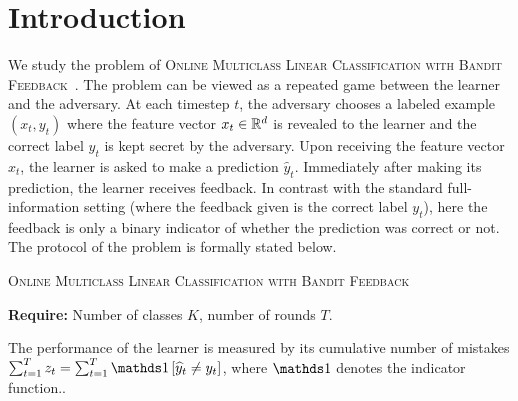 \section{Introduction}
\label{section:introduction}

We study the problem of \textsc{Online Multiclass Linear Classification with
Bandit Feedback}~\citep{Kakade-Shalev-Shwartz-Tewari-2008}. The problem can be
viewed as a repeated game between the learner and the adversary. At each
timestep $t$, the adversary chooses a labeled example $(x_t, y_t)$ where the
feature vector $x_t \in \mathbb{R}^d$ is revealed to the learner and the correct label
$y_t$ is kept secret by the adversary. Upon receiving the feature vector $x_t$,
the learner is asked to make a prediction $\widehat{y}_t$. Immediately after
making its prediction, the learner receives feedback. In contrast with the
standard full-information setting (where the feedback given is the correct label
$y_t$), here the feedback is only a binary indicator of whether the prediction
was correct or not. The protocol of the problem is formally stated below.

\begin{protocol}[h]
\caption{\textsc{Online Multiclass Linear Classification with Bandit Feedback}
\label{algorithm:game-protocol}}
\textbf{Require:} Number of classes $K$, number of rounds $T$.\\

\end{protocol}

The performance of the learner is measured by its cumulative number of
mistakes $\sum_{t=1}^T z_t = \sum_{t=1}^T \indicator{\widehat y_t \neq y_t}$,
where $\one$ denotes the indicator function..

